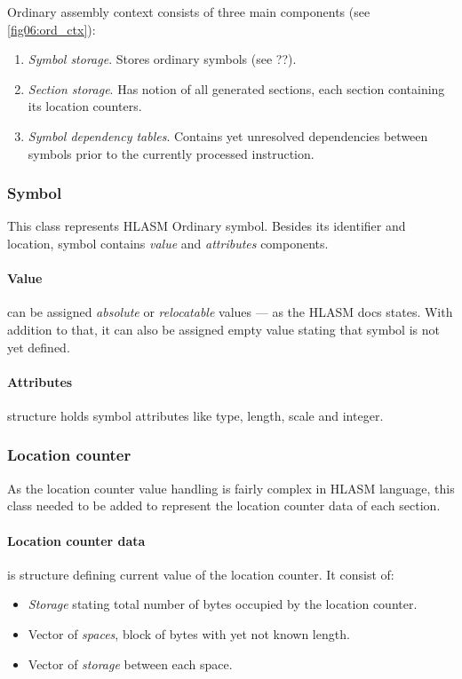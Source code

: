 Ordinary assembly context consists of three main components (see \cref{fig06:ord_ctx}):
\begin{enumerate}
	\item \emph{Symbol storage}. Stores ordinary symbols (see ??).
	\item \emph{Section storage}. Has notion of all generated sections, each section containing its location counters.
	\item \emph{Symbol dependency tables}. Contains yet unresolved dependencies between symbols prior to the currently processed instruction.
\end{enumerate}

\subsubsection{Symbol}

This class represents HLASM Ordinary symbol. Besides its identifier and location, symbol contains \emph{value} and \emph{attributes} components.

\paragraph*{Value} can be assigned \emph{absolute} or \emph{relocatable} values --- as the HLASM docs states. With addition to that, it can also be assigned empty value stating that symbol is not yet defined.

\paragraph*{Attributes} structure holds symbol attributes like type, length, scale and integer.

\subsubsection{Location counter}

As the location counter value handling is fairly complex in HLASM language, this class needed to be added to represent the location counter data of each section.


\paragraph*{Location counter data} is structure defining current value of the location counter. It consist of:
\begin{itemize}
	\item \emph{Storage} stating total number of bytes occupied by the location counter.
	\item Vector of \emph{spaces}, block of bytes with yet not known length.
	\item Vector of \emph{storage} between each space.
\end{itemize}

